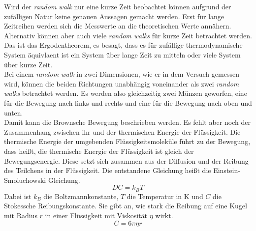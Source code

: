 Wird der \textit{random walk} nur eine kurze Zeit beobachtet können aufgrund der zufälligen Natur keine genauen Aussagen gemacht werden. Erst für lange Zeitreihen werden sich die Messwerte an die theoretischen Werte annähern. Alternativ können aber auch viele \textit{random walks} für kurze Zeit betrachtet werden. Das ist das Ergodentheorem, es besagt, dass es für zufällige thermodynamische System äquivlaent ist ein System über lange Zeit zu mitteln oder viele System über kurze Zeit.\\
Bei einem \textit{random walk} in zwei Dimensionen, wie er in dem Versuch gemessen wird, können die beiden Richtungen unabhängig voneinander als zwei \textit{random walks} betrachtet werden. Es werden also gleichzeitig zwei Münzen geworfen, eine für die Bewegung nach links und rechts und eine für die Bewegung nach oben und unten.\\

Damit kann die Brownsche Bewegung beschrieben werden. Es fehlt aber noch der Zusammenhang zwischen ihr und der thermischen Energie der Flüssigkeit. Die thermische Energie der umgebenden Flüssigkeitsmoleküle führt zu der Bewegung, dass heißt, die thermische Energie der Flüssigkeit ist gleich der Bewegungsenergie. Diese setzt sich zusammen aus der Diffusion und der Reibung des Teilchens in der Flüssigkeit. Die entstandene Gleichung heißt die  Einstein-Smoluchowski Gleichung.
\begin{equation}
  D C = k_B T \label{eq:einstein}
\end{equation}
Dabei ist $k_B$ die Boltzmannkonstante, $T$ die Temperatur in K und $C$ die Stokessche Reibungskonstante. Sie gibt an, wie stark die Reibung auf eine Kugel mit Radius $r$ in einer Flüssigkeit mit Viskosität $\eta$ wirkt.
\begin{equation}
  C = 6 \pi \eta r
\end{equation}
